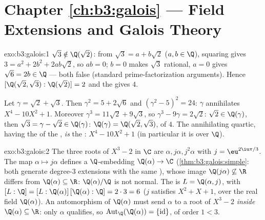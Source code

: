 \section*{Chapter \ref{ch:b3:galois} --- Field Extensions and
Galois Theory}

\begin{solution}{exo:b3:galois:1}
$\sqrt3 \notin \Q(\sqrt2)$: from $\sqrt3 = a + b\sqrt2$ ($a, b
\in \Q$), squaring gives $3 = a^2 + 2b^2 + 2ab\sqrt2$, so $ab =
0$; $b = 0$ makes $\sqrt3$ rational, $a = 0$ gives $\sqrt6 = 2b
\in \Q$ --- both false (standard prime-factorization arguments).
Hence $[\Q(\sqrt2,\sqrt3) : \Q(\sqrt2)] = 2$ and the 
gives  $4$.

Let $\gamma = \sqrt2 + \sqrt3$. Then $\gamma^2 = 5 + 2\sqrt6$ and
$(\gamma^2 - 5)^2 = 24$: $\gamma$ annihilates $X^4 - 10X^2 + 1$.
Moreover $\gamma^3 = 11\sqrt2 + 9\sqrt3$, so $\gamma^3 - 9\gamma
= 2\sqrt2$: $\sqrt2 \in \Q(\gamma)$, then $\sqrt3 = \gamma -
\sqrt2 \in \Q(\gamma)$: $\Q(\gamma) = \Q(\sqrt2,\sqrt3)$, of
 $4$. The annihilating quartic, having the  of the
, \emph{is} the : $X^4 -
10X^2 + 1$ (in particular it is  over $\Q$).
\end{solution}

\begin{solution}{exo:b3:galois:2}
The three roots of $X^3 - 2$ in $\C$ are $\alpha, j\alpha,
j^2\alpha$ with $j = \eu^{2\iu\pi/3}$. The map $\alpha \mapsto
j\alpha$ defines a $\Q$-embedding $\Q(\alpha) \to \C$
(\cref{thm:b3:galois:simple}: both generate degree-$3$ extensions
with the same ), whose image $\Q(j\alpha)
\not\subseteq \R$ differs from $\Q(\alpha) \subseteq \R$:
$\Q(\alpha)/\Q$ is not normal. The  is $L =
\Q(\alpha, j)$, with $[L:\Q] = [L:\Q(\alpha)]\,[\Q(\alpha):\Q] =
2 \cdot 3 = 6$ ($j$ satisfies $X^2 + X + 1$,  over
the real field $\Q(\alpha)$). An automorphism of $\Q(\alpha)$
must send $\alpha$ to a root of $X^3 - 2$ \emph{inside}
$\Q(\alpha) \subseteq \R$: only $\alpha$ qualifies, so
$\operatorname{Aut}_\Q(\Q(\alpha)) = \{\mathrm{id}\}$, of order
$1 < 3$.
\end{solution}

